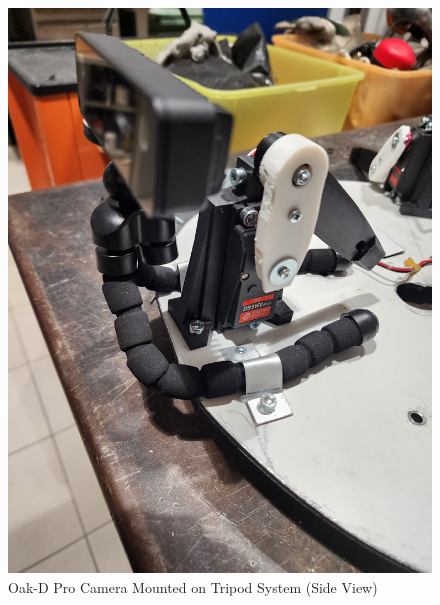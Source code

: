 \begin{figure}[H]
    \centering
    \begin{minipage}{0.45\textwidth}
        \centering
        \includegraphics[width=\textwidth, angle=-90]{Images/TripodOnHeadCamera (3).jpg}
        \caption{Oak-D Pro Camera Mounted on Tripod System (Side View)}
        \label{fig:tripod_camera_mount_side}
    \end{minipage}
    \hfill
    \begin{minipage}{0.45\textwidth}
        \centering

\end{minipage}
\end{figure}
